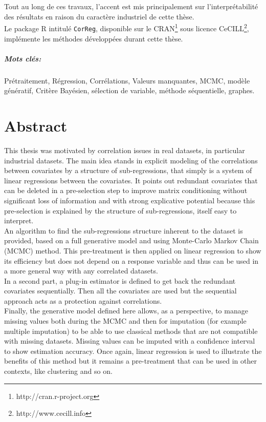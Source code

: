 \documentclass[12pt,a4paper]{report}
\begin{document}
	Tout au long de ces travaux, l'accent est mis principalement sur l'interprétabilité des résultats en raison du caractère industriel de cette thèse. 
\\	

	Le package R intitulé {\tt CorReg}, disponible sur le CRAN\footnote{http://cran.r-project.org} sous licence CeCILL\footnote{http://www.cecill.info}, implémente les méthodes développées durant cette thèse.
	
\paragraph{Mots clés:}Prétraitement, Régression, Corrélations, Valeurs manquantes, MCMC, modèle génératif, Critère Bayésien, sélection de variable, méthode séquentielle, graphes.
\chapter*{Abstract}
	This thesis was motivated by correlation issues in real datasets, in particular industrial datasets. The main idea stands in explicit modeling of the correlations between covariates by a structure of sub-regressions, that simply is a system of linear regressions between the covariates. It points out redundant covariates that can be deleted in a pre-selection step to improve matrix conditioning without significant loss of information and with strong explicative potential because this pre-selection is explained by the structure of sub-regressions, itself easy to interpret.
	\\
	
	An algorithm to find the sub-regressions structure inherent to the dataset is provided, based on a full generative model and using Monte-Carlo Markov Chain (MCMC) method. This pre-treatment is then applied on linear regression to show its efficiency but does not depend on a response variable and thus can be used in a more general way with any correlated datasets.
	\\
	
	In a second part, a plug-in estimator is defined to get back the redundant covariates sequentially. Then all the covariates are used but the sequential approach acts as a protection against correlations.
\\

	Finally, the generative model defined here allows, as a perspective, to manage missing values both during the MCMC and then for imputation (for example multiple imputation) to be able to use classical methods that are not compatible with missing datasets. Missing values can be imputed with a confidence interval to show estimation accuracy. Once again, linear regression is used to illustrate the benefits of this method but it remains a pre-treatment that can be used in other contexts, like clustering and so on.
	\\ 
	
\end{document}
